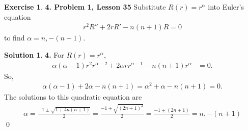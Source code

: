 \documentclass{article}
\theoremstyle{definition}
\newtheorem*{exer*}{Exercise}
\newtheorem*{sln*}{Solution}
\newcommand{\f}[2]{\frac{#1}{#2}}
\begin{document}
\begin{exer*}\textbf{4. Problem 1, Lesson 35} 
	Substitute $R(r) =r^\alpha$ into Euler's equation
	\begin{align*}
	r^2 R'' + 2rR' -n(n+1)R = 0
	\end{align*}
	to find $\alpha = n, -(n+1)$.
	
	\begin{sln*}\textbf{4. } For $R(r) = r^\alpha$,
		\begin{align*}
		\alpha (\alpha - 1) r^2 r^{\alpha-2} + 2\alpha r r^{\alpha-1} -n(n+1)r^{\alpha} &= 0.
		\end{align*}
		So,
		\begin{align*}
		\alpha (\alpha - 1) +  2\alpha-n(n+1) = \alpha^2 + \alpha - n(n+1) =  0.
		\end{align*}
		The solutions to this quadratic equation are
		\begin{align*}
		\alpha = \f{-1 \pm \sqrt{1 + 4n(n+1)}}{2} = \f{-1 \pm \sqrt{(2n+1)^2}}{2} = \f{-1 \pm (2n+1)}{2} = \boxed{n, -(n+1)}
		\end{align*}\qed
	\end{sln*}
	
\end{exer*}
\newpage
\end{document}
